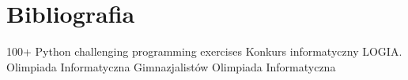 \documentclass[11pt]{article}
\theoremstyle{definition}
\begin{document}
\section{Bibliografia}
\begin{thebibliography}{9}
 100+ Python challenging programming exercises
 Konkurs informatyczny LOGIA.
 Olimpiada Informatyczna Gimnazjalistów
 Olimpiada Informatyczna
\end{thebibliography}
\end{document}
